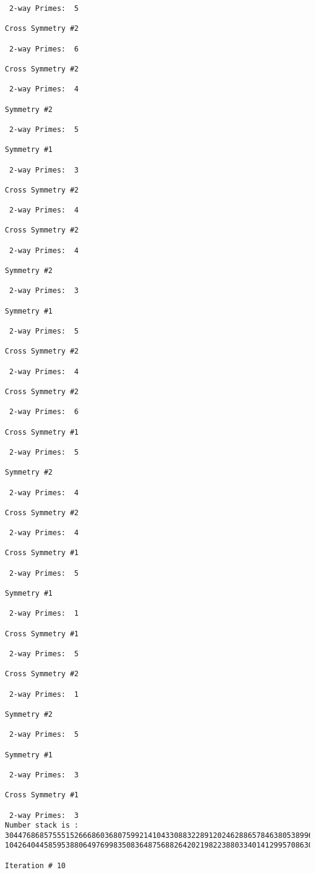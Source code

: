 \begin{verbatim}
 2-way Primes: 	5

Cross Symmetry #2

 2-way Primes: 	6

Cross Symmetry #2

 2-way Primes: 	4

Symmetry #2

 2-way Primes: 	5

Symmetry #1

 2-way Primes: 	3

Cross Symmetry #2

 2-way Primes: 	4

Cross Symmetry #2

 2-way Primes: 	4

Symmetry #2

 2-way Primes: 	3

Symmetry #1

 2-way Primes: 	5

Cross Symmetry #2

 2-way Primes: 	4

Cross Symmetry #2

 2-way Primes: 	6

Cross Symmetry #1

 2-way Primes: 	5

Symmetry #2

 2-way Primes: 	4

Cross Symmetry #2

 2-way Primes: 	4

Cross Symmetry #1

 2-way Primes: 	5

Symmetry #1

 2-way Primes: 	1

Cross Symmetry #1

 2-way Primes: 	5

Cross Symmetry #2

 2-way Primes: 	1

Symmetry #2

 2-way Primes: 	5

Symmetry #1

 2-way Primes: 	3

Cross Symmetry #1

 2-way Primes: 	3
Number stack is :
30447686857555152666860368075992141043308832289120246288657846380538996794608835958544046240163340857
10426404458595388064976998350836487568826420219822388033401412995708630686662515557586867440375804336

Iteration #	10


\end{verbatim}
